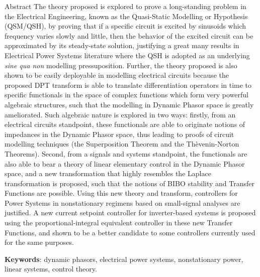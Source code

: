 \documentclass{apaThesis}
\begin{document}
\begin{newabstract}{Abstract}
	The theory proposed is explored to prove a long-standing problem in the Electrical Engineering, known as the Quasi-Static Modelling or Hypothesis (QSM/QSH), by proving that if a specific circuit is excited by sinusoids which frequency varies slowly and little, then the behavior of the excited circuit can be approximated by its steady-state solution, justifying a great many results in Electrical Power Systems literature where the QSH is adopted as an underlying \textit{sine qua non} modelling pressuposition. Further, the theory proposed is also shown to be easily deployable in modelling electrical circuits because the proposed DPT transform is able to translate differentiation operators in time to specific functionals in the space of complex functions which form very powerful algebraic structures, such that the modelling in Dynamic Phasor space is greatly ameliorated. Such algebraic nature is explored in two ways: firstly, from an electrical circuits standpoint, these functionals are able to originate notions of impedances in the Dynamic Phasor space, thus leading to proofs of circuit modelling techniques (the Superposition Theorem and the Thèvenin-Norton Theorems). Second, from a signals and systems standpoint, the functionals are also able to bear a theory of linear elementary control in the Dynamic Phasor space, and a new transformation that highly resembles the Laplace transformation is proposed, such that the notions of BIBO stability and Transfer Functions are possible. Using this new theory and transform, controllers for Power Systems in nonstationary regimens based on small-signal analyses are justified. A new current setpoint controller for inverter-based systems is proposed using the proportional-integral equivalent controller in these new Transfer Functions, and shown to be a better candidate to some controllers currently used for the same purposes.

\noindent
\textbf{Keywords}: dynamic phasors, electrical power systems, nonstationary power, linear systems, control theory.
\end{newabstract}

%
\end{document}
